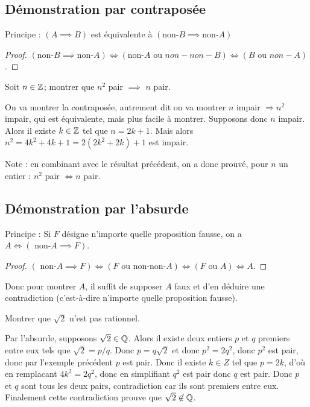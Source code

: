 \subsection{Démonstration par contraposée}

Principe : $(A\implies B)$ est équivalente à $(\text{non-}B \implies \text{non-}A)$

\begin{proof}
$(\text{non-}B \implies \text{non-}A)\iff (\text{non-}A \text{ ou } non-non-B)\iff (B\text{ ou }non-A)$.
\end{proof}

\begin{exemple}
Soit $n\in \mathbb{Z}$; montrer que $n^2$ pair $\implies$ $n$ pair.
\begin{red}
On va montrer la contraposée, autrement dit on va montrer 
\og $n$ impair $\Rightarrow n^2$ impair\fg, qui est équivalente, mais plus facile à montrer. Supposons donc $n$ impair. Alors il existe $k \in\mathbb{Z}$ tel que $n = 2k+1$. Mais alors $n^2 = 4k^2+4k+1 = 2(2k^2+2k)+1$ est impair.\\
\end{red}
\end{exemple}

Note : en combinant avec le résultat précédent, on a donc prouvé, pour $n$ un entier : \og$n^2$ pair $\iff n$ pair.\fg

\subsection{Démonstration par l'absurde}

Principe : Si $F$ désigne n'importe quelle proposition fausse, on a $A \iff (\text{ non-}A \implies F)$.

\begin{proof}
$(\text{ non-}A \implies F) \iff (F\text{ ou non-non-}A)
\iff (F \text{ ou } A) \iff A$.
\end{proof}

Donc pour montrer $A$, il suffit de supposer $A$ faux et d'en déduire une contradiction (c'est-à-dire n'importe quelle proposition fausse).\\
\begin{exemple}
Montrer que $\sqrt{2}$ n'est pas rationnel.
\begin{red}
Par l'absurde, supposons $\sqrt{2}\in\mathbb{Q}$. Alors il existe deux entiers $p$ et $q$ premiers entre eux tels que $\sqrt{2} = p/q$. Donc $p = q\sqrt{2}$ et donc $p^2 = 2 q^2$, donc $p^2$ est pair, donc par l'exemple précédent $p$ est pair. Donc il existe $k\in Z$ tel que $p = 2k$, d'où en remplacant $4k^2 = 2 q^2$, donc en simplifiant $q^2$ est pair donc $q$ est pair. Donc $p$ et $q$ sont tous les deux pairs, contradiction car ils sont premiers entre eux. Finalement cette contradiction prouve que $\sqrt{2} \not\in \mathbb{Q}$.
\end{red}
\end{exemple}


